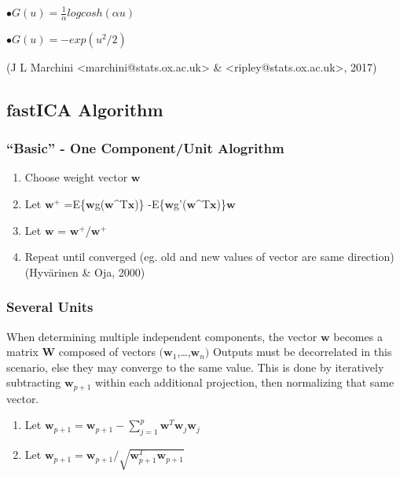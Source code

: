 \documentclass[12pt,twoside]{amherstthesis}
\begin{document}
  \(\bullet G(u) = \frac{1}{\alpha}log cosh(\alpha u)\) \newline
  
  \(\bullet G(u) = -exp(u^2/2)\) \newline
  
  (J L Marchini \textless{}marchini@stats.ox.ac.uk\textgreater{} \&
  \textless{}ripley@stats.ox.ac.uk\textgreater{}, 2017)
  
  \subsection{fastICA Algorithm}\label{fastica-algorithm}
  
  \subsubsection{\texorpdfstring{``Basic'' - One Component/Unit
  Alogrithm}{Basic - One Component/Unit Alogrithm}}\label{basic---one-componentunit-alogrithm}
  
  \begin{enumerate}
  \def\labelenumi{\arabic{enumi}.}
  \item
    Choose weight vector \(\textbf{w}\)
  \item
    Let \(\textbf{w}^+\)
    =E\{\(\textbf{w}\)g(\(\textbf{w}\)\^{}T\(\textbf{x}\))\}
    -E\{\(\textbf{w}\)g'(\(\textbf{w}\)\^{}T\(\textbf{x}\))\}\(\textbf{w}\)
  \item
    Let \(\textbf{w}\) =
    \(\textbf{w}^+\)/\textbar{}\textbar{}\(\textbf{w}^+\)\textbar{}\textbar{}
  \item
    Repeat until converged (eg. old and new values of vector are same
    direction) (Hyvärinen \& Oja, 2000)
  \end{enumerate}
  
  \subsubsection{Several Units}\label{several-units}
  
  When determining multiple independent components, the vector
  \(\textbf{w}\) becomes a matrix \(\textbf{W}\) composed of vectors
  \((\textbf{w}_{1}\),\ldots{},\(\textbf{w}_{n})\) Outputs must be
  decorrelated in this scenario, else they may converge to the same value.
  This is done by iteratively subtracting \(\textbf{w}_{p+1}\) within each
  additional projection, then normalizing that same vector.
  
  \begin{enumerate}
  \def\labelenumi{\arabic{enumi}.}
  \item
    Let
    \(\textbf{w}_{p+1} = \textbf{w}_{p+1} - \sum_{j=1}^p \textbf{w}^T\textbf{w}_{j}\textbf{w}_{j}\)
  \item
    Let
    \(\textbf{w}_{p+1} = \textbf{w}_{p+1}/\sqrt{\textbf{w}_{p+1}^T \textbf{w}_{p+1}}\)
  \end{enumerate}
  
\end{document}
